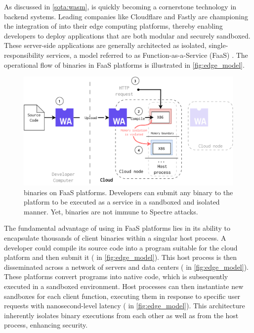 

\label{exploit:defensive}

As discussed in \autoref{sota:wasm}, \Wasm is quickly becoming a cornerstone technology in backend systems. 
Leading companies like Cloudflare and Fastly are championing the integration of \Wasm into their edge computing platforms, thereby enabling developers to deploy applications that are both modular and securely sandboxed. 
These server-side \Wasm applications are generally architected as isolated, single-responsibility services, a model referred to as Function-as-a-Service (FaaS) \cite{pMendkiServerless, 1244493Jacobsson}. 
The operational flow of \Wasm binaries in FaaS platforms is illustrated in \autoref{fig:edge_model}.

\begin{figure}[h]
    \centering
    \includegraphics[width=0.8\linewidth]{figures/edge.pdf}
    \caption{\Wasm binaries on FaaS platforms. Developers can submit any \Wasm binary to the platform to be executed as a service in a sandboxed and isolated manner. Yet, \Wasm binaries are not immune to Spectre attacks.}
    \label{fig:edge_model}
\end{figure}


The fundamental advantage of using \Wasm in FaaS platforms lies in its ability to encapsulate thousands of client \Wasm binaries within a singular host process.
A developer could compile its source code into a \Wasm program suitable for the cloud platform and then submit it ( in \autoref{fig:edge_model}).
This host process is then disseminated across a network of servers and data centers ( in \autoref{fig:edge_model}). 
These platforms convert \Wasm programs into native code, which is subsequently executed in a sandboxed environment. 
Host processes can then instantiate new \Wasm sandboxes for each client function, executing them in response to specific user requests with nanosecond-level latency ( in \autoref{fig:edge_model}). 
This architecture inherently isolates \Wasm binary executions from each other as well as from the host process, enhancing security.

